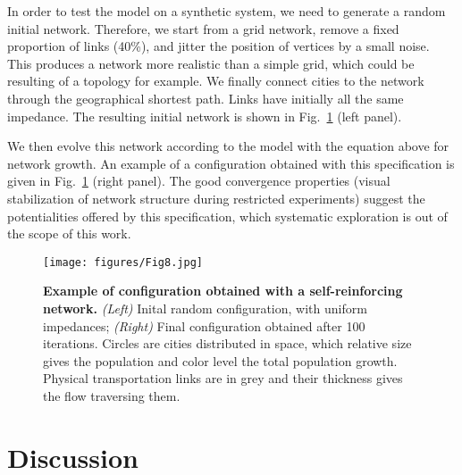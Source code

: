 \documentclass[11pt]{article}
\begin{document}
In order to test the model on a synthetic system, we need to generate a random initial network. Therefore, we start from a grid network, remove a fixed proportion of links (40\%), and jitter the position of vertices by a small noise. This produces a network more realistic than a simple grid, which could be resulting of a topology for example. We finally connect cities to the network through the geographical shortest path. Links have initially all the same impedance. The resulting initial network is shown in Fig.~\ref{fig:macrocoevolution:slimemould} (left panel).

We then evolve this network according to the model with the equation above for network growth. An example of a configuration obtained with this specification is given in Fig.~\ref{fig:macrocoevolution:slimemould} (right panel). The good convergence properties (visual stabilization of network structure during restricted experiments) suggest the potentialities offered by this specification, which systematic exploration is out of the scope of this work.


\begin{figure}
	\texttt{[image: figures/Fig8.jpg]}
	\caption[Example of application of the macroscopic model with a self-reinforcing network]{\textbf{Example of configuration obtained with a self-reinforcing network.} \textit{(Left)} Inital random configuration, with uniform impedances; \textit{(Right)} Final configuration obtained after 100 iterations. Circles are cities distributed in space, which relative size gives the population and color level the total population growth. Physical transportation links are in grey and their thickness gives the flow traversing them.\label{fig:macrocoevolution:slimemould}}
\end{figure}




\section{Discussion}
\end{document}
